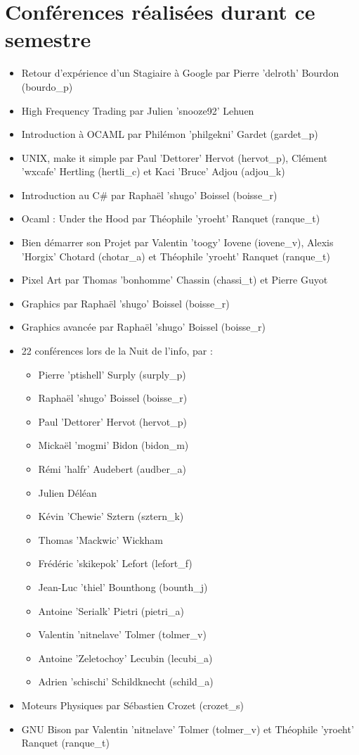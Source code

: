 \documentclass[12pt]{report}
\begin{document}
  \section{Conférences réalisées durant ce semestre}
  \begin{itemize}
    \item Retour d'expérience d'un Stagiaire à Google par Pierre 'delroth' Bourdon (bourdo\_p)
    \item High Frequency Trading par Julien 'snooze92' Lehuen
    \item Introduction à OCAML par Philémon 'philgekni' Gardet (gardet\_p)
    \item UNIX, make it simple par Paul 'Dettorer' Hervot (hervot\_p), Clément 'wxcafe' Hertling (hertli\_c) et Kaci 'Bruce' Adjou (adjou\_k)
    \item Introduction au C\# par Raphaël 'shugo' Boissel (boisse\_r)
    \item Ocaml : Under the Hood par Théophile 'yroeht' Ranquet (ranque\_t)
    \item Bien démarrer son Projet par Valentin 'toogy' Iovene (iovene\_v), Alexis 'Horgix' Chotard (chotar\_a) et Théophile 'yroeht' Ranquet (ranque\_t)
    \item Pixel Art par Thomas 'bonhomme' Chassin (chassi\_t) et Pierre Guyot
    \item Graphics par Raphaël 'shugo' Boissel (boisse\_r)
    \item Graphics avancée par Raphaël 'shugo' Boissel (boisse\_r)
    \item 22 conférences lors de la Nuit de l'info, par : \\
      \begin{itemize}
        \item Pierre 'ptishell' Surply (surply\_p)
        \item Raphaël 'shugo' Boissel (boisse\_r)
        \item Paul 'Dettorer' Hervot (hervot\_p)
        \item Mickaël 'mogmi' Bidon (bidon\_m)
        \item Rémi 'halfr' Audebert (audber\_a)
        \item Julien Déléan
        \item Kévin 'Chewie' Sztern (sztern\_k)
        \item Thomas 'Mackwic' Wickham
        \item Frédéric 'skikepok' Lefort (lefort\_f)
        \item Jean-Luc 'thiel' Bounthong (bounth\_j)
        \item Antoine 'Serialk' Pietri (pietri\_a)
        \item Valentin 'nitnelave' Tolmer (tolmer\_v)
        \item Antoine 'Zeletochoy' Lecubin (lecubi\_a)
        \item Adrien 'schischi' Schildknecht (schild\_a)
      \end{itemize}
    \item Moteurs Physiques par Sébastien Crozet (crozet\_s)
    \item GNU Bison par Valentin 'nitnelave' Tolmer (tolmer\_v) et Théophile 'yroeht' Ranquet (ranque\_t)
  \end{itemize}
\end{document}

